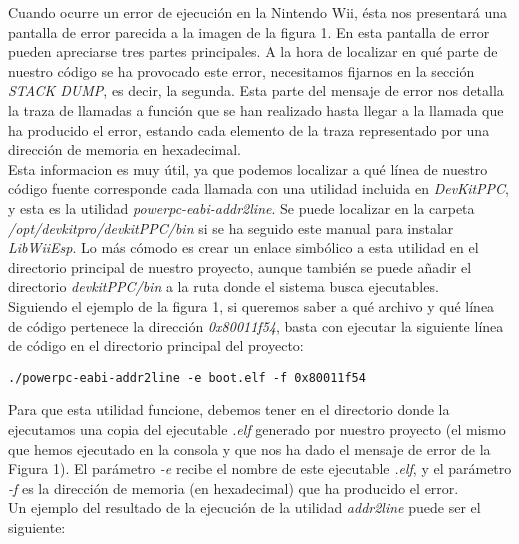 
Cuando ocurre un error de ejecución en la Nintendo Wii, ésta nos presentará una pantalla de error parecida a la imagen de la figura 1. En esta pantalla de error pueden apreciarse tres partes principales. A la hora de localizar en qué parte de nuestro código se ha provocado este error, necesitamos fijarnos en la sección \emph{STACK DUMP}, es decir, la segunda. Esta parte del mensaje de error nos detalla la traza de llamadas a función que se han realizado hasta llegar a la llamada que ha producido el error, estando cada elemento de la traza representado por una dirección de memoria en hexadecimal.\\

Esta informacion es muy útil, ya que podemos localizar a qué línea de nuestro código fuente corresponde cada llamada con una utilidad incluida en \emph{DevKitPPC}, y esta es la utilidad \emph{powerpc-eabi-addr2line}. Se puede localizar en la carpeta \emph{/opt/devkitpro/devkitPPC/bin} si se ha seguido este manual para instalar \emph{LibWiiEsp}. Lo más cómodo es crear un enlace simbólico a esta utilidad en el directorio principal de nuestro proyecto, aunque también se puede añadir el directorio \emph{devkitPPC/bin} a la ruta donde el sistema busca ejecutables.\\

Siguiendo el ejemplo de la figura 1, si queremos saber a qué archivo y qué línea de código pertenece la dirección \emph{0x80011f54}, basta con ejecutar la siguiente línea de código en el directorio principal del proyecto:

\begin{lstlisting}[style=consola]
  ./powerpc-eabi-addr2line -e boot.elf -f 0x80011f54
\end{lstlisting}

Para que esta utilidad funcione, debemos tener en el directorio donde la ejecutamos una copia del ejecutable \emph{.elf} generado por nuestro proyecto (el mismo que hemos ejecutado en la consola y que nos ha dado el mensaje de error de la Figura 1). El parámetro \emph{-e} recibe el nombre de este ejecutable \emph{.elf}, y el parámetro \emph{-f} es la dirección de memoria (en hexadecimal) que ha producido el error.\\

Un ejemplo del resultado de la ejecución de la utilidad \emph{addr2line} puede ser el siguiente:


